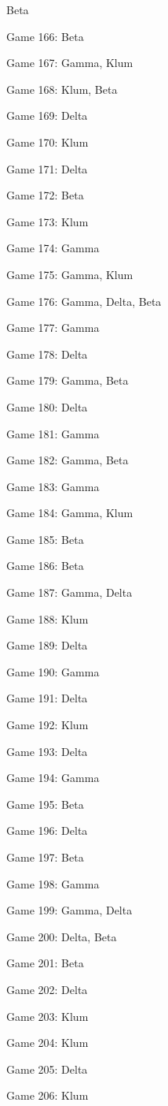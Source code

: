 \documentclass{article}
\begin{document}
\begin{multicols}{3}
\begin{compactitem}
Beta
\item Game 166:
Beta
\item Game 167:
Gamma, Klum
\item Game 168:
Klum, Beta
\item Game 169:
Delta
\item Game 170:
Klum
\item Game 171:
Delta
\item Game 172:
Beta
\item Game 173:
Klum
\item Game 174:
Gamma
\item Game 175:
Gamma, Klum
\item Game 176:
Gamma, Delta, Beta
\item Game 177:
Gamma
\item Game 178:
Delta
\item Game 179:
Gamma, Beta
\item Game 180:
Delta
\item Game 181:
Gamma
\item Game 182:
Gamma, Beta
\item Game 183:
Gamma
\item Game 184:
Gamma, Klum
\item Game 185:
Beta
\item Game 186:
Beta
\item Game 187:
Gamma, Delta
\item Game 188:
Klum
\item Game 189:
Delta
\item Game 190:
Gamma
\item Game 191:
Delta
\item Game 192:
Klum
\item Game 193:
Delta
\item Game 194:
Gamma
\item Game 195:
Beta
\item Game 196:
Delta
\item Game 197:
Beta
\item Game 198:
Gamma
\item Game 199:
Gamma, Delta
\item Game 200:
Delta, Beta
\item Game 201:
Beta
\item Game 202:
Delta
\item Game 203:
Klum
\item Game 204:
Klum
\item Game 205:
Delta
\item Game 206:
Klum

\end{compactitem}
\end{multicols}
\end{document}
